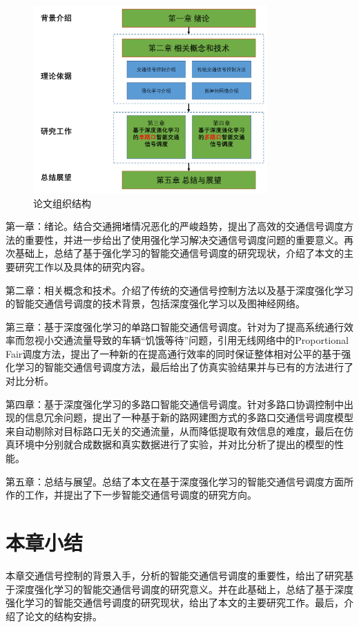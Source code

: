 \begin{figure}[htb]
    \includegraphics[width=0.8\textwidth]{fig/paper-struct.pdf}
    \caption{论文组织结构}
    \label{fig:paper-struct}
\end{figure}
第一章：绪论。结合交通拥堵情况恶化的严峻趋势，提出了高效的交通信号调度方法的重要性，并进一步给出了使用强化学习解决交通信号调度问题的重要意义。再次基础上，总结了基于强化学习的智能交通信号调度的研究现状，介绍了本文的主要研究工作以及具体的研究内容。

第二章：相关概念和技术。介绍了传统的交通信号控制方法以及基于深度强化学习的智能交通信号调度的技术背景，包括深度强化学习以及图神经网络。

第三章：基于深度强化学习的单路口智能交通信号调度。针对为了提高系统通行效率而忽视小交通流量导致的车辆“饥饿等待”问题，引用无线网络中的Proportional Fair调度方法，提出了一种新的在提高通行效率的同时保证整体相对公平的基于强化学习的智能交通信号调度方法，最后给出了仿真实验结果并与已有的方法进行了对比分析。

第四章：基于深度强化学习的多路口智能交通信号调度。针对多路口协调控制中出现的信息冗余问题，提出了一种基于新的路网建图方式的多路口交通信号调度模型来自动剔除对目标路口无关的交通流量，从而降低提取有效信息的难度，最后在仿真环境中分别就合成数据和真实数据进行了实验，并对比分析了提出的模型的性能。

第五章：总结与展望。总结了本文在基于深度强化学习的智能交通信号调度方面所作的工作，并提出了下一步智能交通信号调度的研究方向。

\section{本章小结}
本章交通信号控制的背景入手，分析的智能交通信号调度的重要性，给出了研究基于深度强化学习的智能交通信号调度的研究意义。并在此基础上，总结了基于深度强化学习的智能交通信号调度的研究现状，给出了本文的主要研究工作。最后，介绍了论文的结构安排。